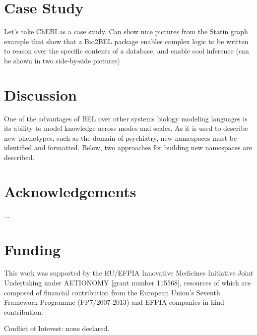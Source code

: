 \documentclass{bioinfo}
\begin{document}
\section{Case Study}

Let's take ChEBI as a case study. Can show nice pictures from the Statin graph example
that show that a Bio2BEL package enables complex logic to be written to reason over
the specific contents of a database, and enable cool inference (can be shown in two 
side-by-side pictures)

\section{Discussion}

One of the advantages of BEL over other systems biology modeling languages is its ability to model knowledge across modes and scales. As it is used to describe new phenotypes, such as the domain of psychiatry, new namespaces must be identified and formatted. Below, two approaches for building new namespaces are described.

\section*{Acknowledgements}

...

\section*{Funding}

This work was supported by the EU/EFPIA Innovative Medicines Initiative Joint Undertaking under AETIONOMY [grant number 115568], resources of which are composed of financial contribution from the European Union's Seventh Framework Programme (FP7/2007-2013) and EFPIA companies in kind contribution.

Conflict of Interest: none declared.



\end{document}

